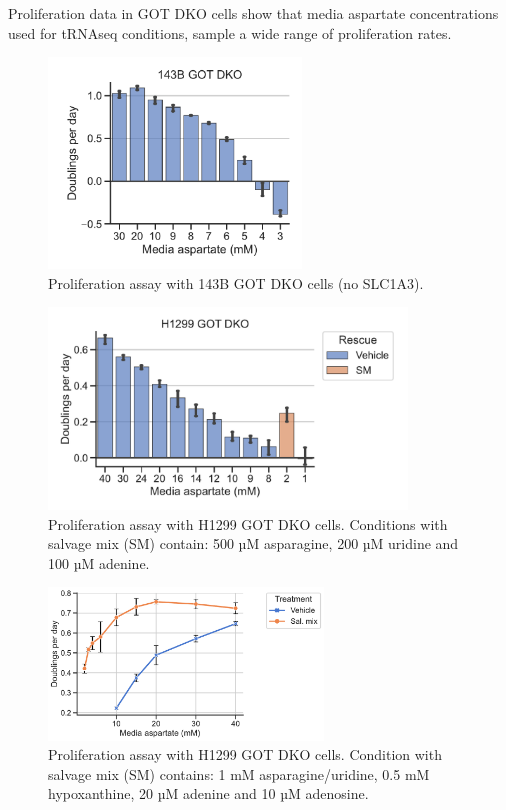 \FloatBarrier
Proliferation data in GOT DKO cells show that media aspartate concentrations used for tRNAseq conditions, sample a wide range of proliferation rates.

\begin{figure}[ht]
    \centering
    \includegraphics[width=0.6\textwidth]{figures/sapp/tRNA/143B_DKO_asp-titr.pdf}
    \caption[Asp titration in 143B GOT DKO.]{
    Proliferation assay with 143B GOT DKO cells (no SLC1A3).
    }
    \label{fig:sapp:tRNA:143B_DKO_asp_prlfr}
\end{figure}

\begin{figure}[ht]
    \centering
    \includegraphics[width=0.85\textwidth]{figures/sapp/tRNA/H1299_DKO_asp-titr.pdf}
    \caption[Asp titration in H1299 GOT DKO.]{
    Proliferation assay with H1299 GOT DKO cells.
    Conditions with salvage mix (SM) contain: 500 µM asparagine, 200 µM uridine and 100 µM adenine.
    }
    \label{fig:sapp:tRNA:H1299_DKO_prlfr1}
\end{figure}

\begin{figure}[ht]
    \centering
    \includegraphics[width=0.65\textwidth]{figures/sapp/tRNA/H1299_GOT-DKO_prlfr.pdf}
    \caption[Asp titration in H1299 GOT DKO.]{
    Proliferation assay with H1299 GOT DKO cells.
    Condition with salvage mix (SM) contains: 1 mM asparagine/uridine, 0.5 mM hypoxanthine, 20 µM adenine and 10 µM adenosine.
    }
    \label{fig:sapp:tRNA:H1299_DKO_prlfr2}
\end{figure}

